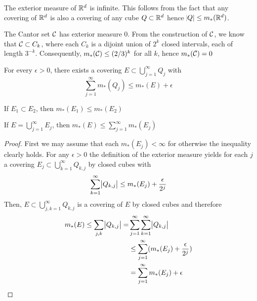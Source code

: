 \documentclass[11pt]{article}
\begin{document}
\begin{examplle}[]
The exterior measure of \(\mathbb{R}^d\) is infinite. This follows from the fact that
any covering of \(\mathbb{R}^d\) is also a covering of any cube \(Q\subset\mathbb{R}^d\) hence
\(\abs{Q}\le m_*(\mathbb{R}^d)\).
\end{examplle}

\begin{examplle}[]
The Cantor set \(\mathcal{C}\) has exterior measure 0. From the construction of
\(\mathcal{C}\), we know that \(\mathcal{C}\subset C_k\), where each \(C_k\) is a dijoint union
of \(2^k\) closed intervals, each of length \(3^{-k}\). Consequently,
\(m_*(\mathcal{C})\le(2/3)^k\) for all \(k\), hence \(m_*(\mathcal{C})=0\)
\end{examplle}


\begin{proposition}
For every \(\epsilon>0\), there exists a covering \(E\subset\bigcup_{j=1}^\infty
   Q_j\) with
\begin{equation*}
\displaystyle\sum_{j=1}^\infty m_*(Q_j)\le m_*(E)+\epsilon
\end{equation*}
\end{proposition}

\begin{proposition}[Monotonicity]
If \(E_1\subset E_2\), then \(m_*(E_1)\le m_*(E_2)\)
\end{proposition}

\begin{proposition}
\label{ob2}
If \(E=\bigcup_{j=1}^\infty E_j\), then \(m_*(E)\le\sum_{j=1}^\infty m_*(E_j)\)
\end{proposition}
\begin{proof}
First we may assume that each \(m_*(E_j)<\infty\) for otherwise the inequality
clearly holds. For any \(\epsilon>0\) the definition of the exterior measure
yields for each \(j\) a covering \(E_j\subset\bigcup_{k=1}^\infty Q_{k,j}\) by
closed cubes with
\begin{equation*}
\displaystyle\sum_{k=1}^\infty\abs{Q_{k,j}}\le m_*(E_j)+\frac{\epsilon}{2^j}
\end{equation*}
Then, \(E\subset\bigcup_{j,k=1}^\infty Q_{k,j}\) is a covering of \(E\) by closed
cubes and therefore
\begin{align*}
m_*(E)\le \displaystyle\sum_{j,k}\abs{Q_{k,j}}=&\displaystyle\sum_{j=1}^\infty
\displaystyle\sum_{k=1}^\infty\abs{Q_{k,j}}\\
&\le \displaystyle\sum_{j=1}^\infty(m_*(E_j)+\frac{\epsilon}{2^j})\\
&=\displaystyle\sum_{j=1}^\infty m_*(E_j)+\epsilon
\end{align*}
\end{proof}
\end{document}
